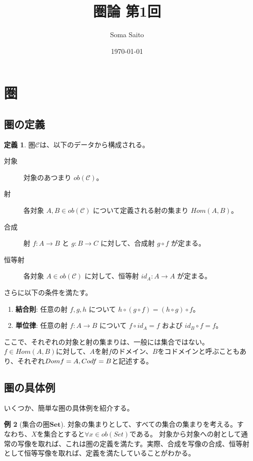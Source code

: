 \documentclass[unicode,12pt,report]{ltjsarticle}
\title{圏論 第1回}
\author{Soma Saito}
\date{\today}
\theoremstyle{definition}
\newtheorem{definition}{定義}[section]
\newtheorem{example}[definition]{例}
\begin{document}
\maketitle
\tableofcontents
\clearpage

\section{圏}
\subsection{圏の定義}
\begin{definition}
  圏$\mathcal C$は、以下のデータから構成される。
  \begin{description}
    \item[対象] 対象のあつまり $ob(\mathcal{C})$。
    \item[射] 各対象 $A, B \in ob(\mathcal{C})$ について定義される射の集まり $Hom(A, B)$。
    \item[合成] 射 $f: A \to B$ と $g: B \to C$ に対して、合成射 $g \circ f$ が定まる。 
    \item[恒等射] 各対象 $A \in ob(\mathcal{C})$ に対して、恒等射 $id_A: A \to A$ が定まる。 
  \end{description}
  さらに以下の条件を満たす。
  \begin{enumerate}
    \item \textbf{結合則}: 任意の射 $f, g, h$ について $h \circ (g \circ f) = (h \circ g) \circ f$。
    \item \textbf{単位律}: 任意の射 $f: A \to B$ について $f \circ id_A = f$ および $id_B \circ f = f$。
  \end{enumerate}
\end{definition}

ここで、それぞれの対象と射の集まりは、一般には集合ではない。\\
$f \in Hom(A, B)$に対して、$A$を射$f$のドメイン、$B$をコドメインと呼ぶこともあり、それぞれ$Dom f = A, \space Cod f = B$と記述する。

\subsection{圏の具体例}
いくつか、簡単な圏の具体例を紹介する。

\begin{example}[集合の圏$\mathbf{Set}$]
  対象の集まりとして、すべての集合の集まりを考える。すなわち、$X$を集合とすると$\forall x \in ob(Set)$である。
  対象から対象への射として通常の写像を取れば、これは圏の定義を満たす。実際、合成を写像の合成、恒等射として恒等写像を取れば、定義を満たしていることがわかる。
\end{example}
\end{document}
